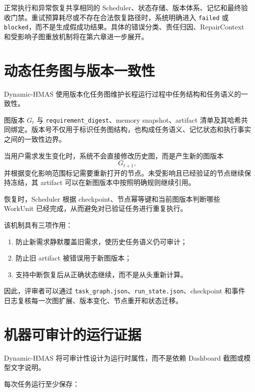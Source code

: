 \documentclass[UTF8,a4paper,12pt,oneside]{ctexbook}
\begin{document}
正常执行和异常恢复共享相同的 Scheduler、状态存储、版本体系、记忆和最终验收门禁。重试预算耗尽或不存在合法恢复路径时，系统明确进入 \texttt{failed} 或 \texttt{blocked}，而不是生成假成功结果。具体的错误分类、责任归因、RepairContext 和受影响子图重放机制将在第六章进一步展开。


\section{动态任务图与版本一致性}

Dynamic-HMAS 使用版本化任务图维护长程运行过程中任务结构和任务语义的一致性。

图版本 $G_t$ 与 \texttt{requirement\_digest}、memory snapshot、artifact 清单及其哈希共同绑定。版本号不仅用于标识任务图结构，也构成任务语义、记忆状态和执行事实之间的一致性边界。

当用户需求发生变化时，系统不会直接修改历史图，而是产生新的图版本
\[
G_{t+1},
\]
并根据变化影响范围标记需要重新打开的节点。未受影响且已经验证的节点继续保持冻结，其 artifact 可以在新图版本中按照明确规则继续引用。

恢复时，Scheduler 根据 checkpoint、节点幂等键和当前图版本判断哪些 WorkUnit 已经完成，从而避免对已验证任务进行重复执行。

该机制具有三项作用：

\begin{enumerate}
    \item 防止新需求静默覆盖旧需求，使历史任务语义仍可审计；
    \item 防止旧 artifact 被错误用于新图版本；
    \item 支持中断恢复后从正确状态继续，而不是从头重新计算。
\end{enumerate}

因此，评审者可以通过 \texttt{task\_graph.json}、\texttt{run\_state.json}、checkpoint 和事件日志复核每一次图扩展、版本变化、节点重开和状态迁移。


\section{机器可审计的运行证据}

Dynamic-HMAS 将可审计性设计为运行时属性，而不是依赖 Dashboard 截图或模型文字说明。

每次任务运行至少保存：
\end{document}
